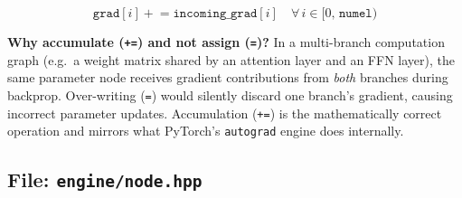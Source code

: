\documentclass[12pt, a4paper]{article}
\begin{document}
\[
  \texttt{grad}[i] \mathrel{+}= \texttt{incoming\_grad}[i]
  \quad \forall\, i \in [0,\, \texttt{numel})
\]

\begin{tcolorbox}[interviewbox, title={Interview Talking Point}]
  \textbf{Why accumulate (\texttt{+=}) and not assign (\texttt{=})?}
  In a multi-branch computation graph (e.g.\ a weight matrix shared by an
  attention layer and an FFN layer), the same parameter node receives gradient
  contributions from \emph{both} branches during backprop.  Over-writing
  (\texttt{=}) would silently discard one branch's gradient, causing incorrect
  parameter updates.  Accumulation (\texttt{+=}) is the mathematically correct
  operation and mirrors what PyTorch's \texttt{autograd} engine does internally.
\end{tcolorbox}

\newpage
\subsection{File: \texttt{engine/node.hpp}}
\end{document}
